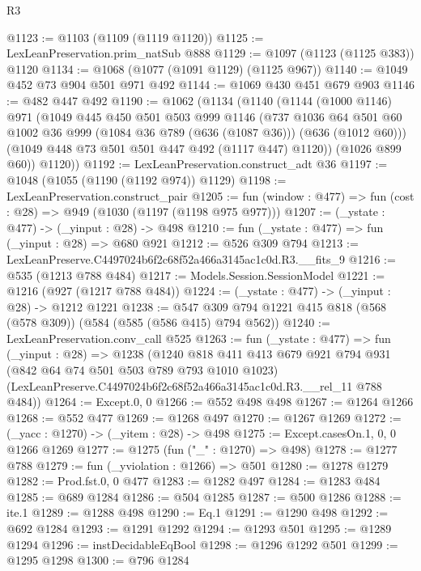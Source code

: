 \begin{lexlean}{R3}
\begin{coremodule}
@1123 := @1103 (@1109 (@1119 @1120))
@1125 := LexLeanPreservation.prim_natSub @888
@1129 := @1097 (@1123 (@1125 @383)) @1120
@1134 := @1068 (@1077 (@1091 @1129) (@1125 @967))
@1140 := @1049 @452 @73 @904 @501 @971 @492
@1144 := @1069 @430 @451 @679 @903
@1146 := @482 @447 @492
@1190 := @1062
    (@1134
      (@1140
        (@1144
          (@1000 @1146)
          @971
          (@1049
            @445
            @450
            @501
            @503
            @999
            @1146
            (@737
              @1036
              @64
              @501
              @60
              @1002
              @36
              @999
              (@1084 @36 @789 (@636 (@1087 @36)))
              (@636 (@1012 @60)))
            (@1049 @448 @73 @501 @501 @447 @492 (@1117 @447) @1120))
          (@1026 @899 @60))
        @1120))
@1192 := LexLeanPreservation.construct_adt @36
@1197 := @1048 (@1055 (@1190 (@1192 @974)) @1129)
@1198 := LexLeanPreservation.construct_pair
@1205 := fun (window : @477) => fun (cost : @28) => @949 (@1030 (@1197 (@1198 @975 @977)))
@1207 := (_ystate : @477) -> (_yinput : @28) -> @498
@1210 := fun (_ystate : @477) => fun (_yinput : @28) => @680 @921
@1212 := @526 @309 @794
@1213 := LexLeanPreserve.C4497024b6f2c68f52a466a3145ac1c0d.R3.__fits_9
@1216 := @535 (@1213 @788 @484)
@1217 := Models.Session.SessionModel
@1221 := @1216 (@927 (@1217 @788 @484))
@1224 := (_ystate : @477) -> (_yinput : @28) -> @1212 @1221
@1238 := @547 @309 @794 @1221 @415 @818 (@568 (@578 @309)) (@584 (@585 (@586 @415) @794 @562))
@1240 := LexLeanPreservation.conv_call @525
@1263 := fun (_ystate : @477) =>
  fun (_yinput : @28) =>
  @1238
    (@1240
      @818
      @411
      @413
      @679
      @921
      @794
      @931
      (@842 @64 @74 @501 @503 @789 @793 @1010 @1023)
      (LexLeanPreserve.C4497024b6f2c68f52a466a3145ac1c0d.R3.__rel_11 @788 @484))
@1264 := Except.{0, 0}
@1266 := @552 @498 @498
@1267 := @1264 @1266
@1268 := @552 @477
@1269 := @1268 @497
@1270 := @1267 @1269
@1272 := (_yacc : @1270) -> (_yitem : @28) -> @498
@1275 := Except.casesOn.{1, 0, 0} @1266 @1269
@1277 := @1275 (fun ("_" : @1270) => @498)
@1278 := @1277 @788
@1279 := fun (_yviolation : @1266) => @501
@1280 := @1278 @1279
@1282 := Prod.fst.{0, 0} @477
@1283 := @1282 @497
@1284 := @1283 @484
@1285 := @689 @1284
@1286 := @504 @1285
@1287 := @500 @1286
@1288 := ite.{1}
@1289 := @1288 @498
@1290 := Eq.{1}
@1291 := @1290 @498
@1292 := @692 @1284
@1293 := @1291 @1292
@1294 := @1293 @501
@1295 := @1289 @1294
@1296 := instDecidableEqBool
@1298 := @1296 @1292 @501
@1299 := @1295 @1298
@1300 := @796 @1284

\end{coremodule}
\end{lexlean}
